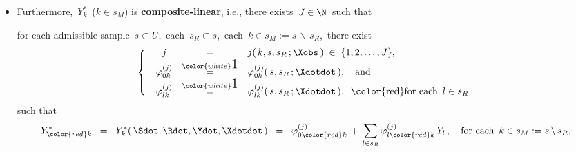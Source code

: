 \begin{itemize}
\begin{itemize}
    \item
        for each \,$i \in s$,\,
        \,$Y^{\dagger}_{i} \;=\; R_{i}\,Y_{i}+(1-R_{i})\,Y^{*}_{i}$,\,
        and
        \begin{equation*}
        Y^{*}_{k}
        \;\; = \;\;
            Y^{*}_{k}(\,\Sdot,\Rdot,\Ydot,\Xdotdot\,)\,,
        \quad
        \textnormal{for each \,$k \in s_{M} = s\,\backslash\,s_{R}$},
        \end{equation*}
        is an imputed value for
        \,$Y_{k}$\, and \,$Y^{*}_{k}$\,
        may depend on
        \,$\Sdot,\Rdot,\Ydot,\Xdotdot$.\,
    \end{itemize}
\item
    Furthermore, \,$Y^{*}_{k}$\, ($k \in s_{M}$) is \textbf{composite-linear},
    i.e., there exists \,$J \in \N$\, such that
    \begin{center}
    \begin{minipage}{6.2in}
    for each admissible sample \,$s \subset U$,\,
    each \,$s_{R} \subset s$,\,
    {\color{red}each} \,{\color{red}$k \in s_{M} := s \,\backslash\, s_{R}$},\,
    there exist
    \begin{equation*}
    \left\{\;\;\begin{array}{ccl}
    j
    & = &
        j(\,k,s,s_{R}\,;\Xobs\,) \;\in\; \{1,2,\ldots,J\},
    \\
    \varphi^{(j)}_{0k}
    & \overset{{\color{white}\textnormal{\Large$1$}}}{=} &
        \varphi^{(j)}_{0k}(\,s,s_{R}\,;\Xdotdot\,),
        \quad
        \textnormal{and}
    \\
    \varphi^{(j)}_{lk}
    & \overset{{\color{white}\textnormal{\Large$1$}}}{=} &
        \varphi^{(j)}_{lk}(\,s,s_{R}\,;\Xdotdot\,),
        \;\;
        \textnormal{{\color{red}for each \,$l \in s_{R}$}}
    \end{array}\right.
    \end{equation*}
    such that
    \begin{equation*}
    Y_{{\color{red}k}}^{*}
    \;\; = \;\;
        Y^{*}_{k}(\,\Sdot,\Rdot,\Ydot,\Xdotdot\,)
    \;\; = \;\;
        \varphi^{(j)}_{0{\color{red}k}}
        \,+\,
        \underset{l \in s_{R}}{\sum}\,\varphi^{(j)}_{l{\color{red}k}}\,Y_{l}\,,
        \quad
        \textnormal{for each \,$k \in s_{M} := s \,\backslash\, s_{R}$},
    \end{equation*}
    \end{minipage}
    \end{center}
\end{itemize}
